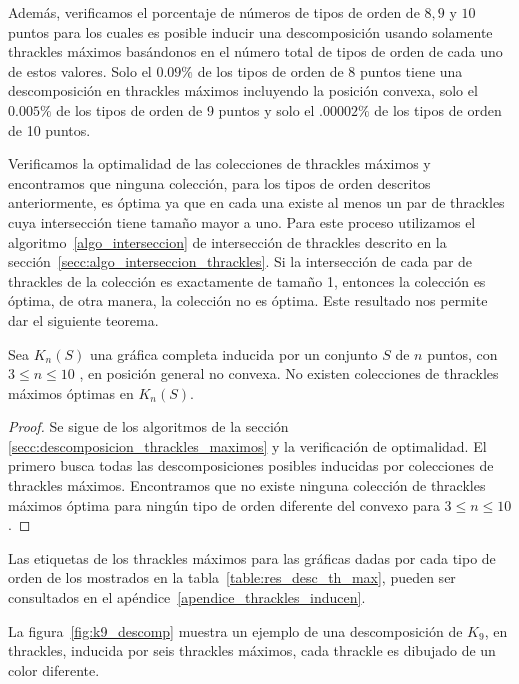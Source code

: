   Además, verificamos el porcentaje de números de tipos de orden de $8,9$ y $10$ puntos para los cuales es
  posible inducir una descomposición usando solamente thrackles máximos basándonos en el número total de
  tipos de orden de cada uno de estos valores. Solo el $0.09\%$ de los tipos de orden de 8 puntos tiene una
  descomposición en thrackles máximos incluyendo la posición convexa, solo el $0.005\%$ de los tipos de
  orden de 9 puntos y solo el $.00002\%$ de los tipos de orden de 10 puntos.

  Verificamos la optimalidad de las colecciones de thrackles máximos y encontramos
  que ninguna colección, para los tipos de orden descritos anteriormente,
  es óptima ya que en cada una existe al menos un par de thrackles cuya intersección tiene
  tamaño mayor a uno. Para este proceso utilizamos el algoritmo~\ref{algo_interseccion} de intersección de
  thrackles descrito en la sección~\ref{secc:algo_interseccion_thrackles}. Si la intersección
  de cada par de thrackles de la colección es exactamente de tamaño 1, entonces la
  colección es óptima, de otra manera, la colección no es óptima. Este resultado nos
  permite dar el siguiente teorema.

  \begin{theorem}\label{teo:coleccion_optima}
    Sea $K_n(S)$ una gráfica completa inducida por un conjunto $S$ de $n$ puntos,
    con $3\leq n\leq 10$ , en posición general no convexa. No existen
    colecciones de thrackles máximos óptimas en $K_n(S)$.
  \end{theorem}
  \begin{proof}
    Se sigue de los algoritmos de la sección \ref{secc:descomposicion_thrackles_maximos}
    y la verificación de optimalidad. El primero busca todas
    las descomposiciones posibles inducidas por colecciones de thrackles máximos.
    Encontramos que no existe ninguna colección de thrackles máximos óptima para ningún tipo de orden diferente del convexo para
    $3\leq n\leq 10$.
  \end{proof}

  Las etiquetas de los thrackles máximos para las gráficas dadas por cada
  tipo de orden de los mostrados en la tabla~\ref{table:res_desc_th_max}, pueden
  ser consultados en el apéndice~\ref{apendice_thrackles_inducen}.

  La figura~\ref{fig:k9_descomp} muestra un ejemplo de una
  descomposición de $K_9$, en thrackles, inducida por seis
  thrackles máximos, cada thrackle es dibujado de un color diferente.

